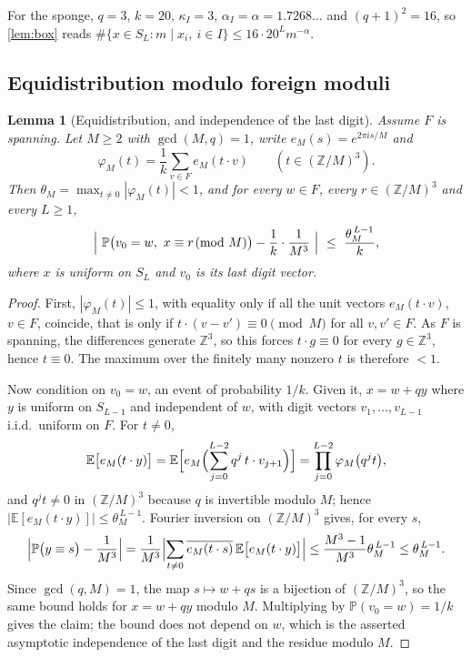 \documentclass[11pt]{amsart}
\newtheorem{lemma}[theorem]{Lemma}
\theoremstyle{definition}
\theoremstyle{remark}
\begin{document}
For the sponge, $q=3$, $k=20$, $\kappa_I=3$, $\alpha_I=\alpha=1.7268\ldots$ and $(q+1)^2=16$, so \cref{lem:box} reads $\#\{x\in S_L:m\mid x_i,\ i\in I\}\le16\cdot20^Lm^{-\alpha}$.

\subsection*{Equidistribution modulo foreign moduli}

\begin{lemma}[Equidistribution, and independence of the last digit]
\label{lem:equi}
Assume $F$ is spanning. Let $M\ge2$ with $\gcd(M,q)=1$, write $e_M(s)=e^{2\pi is/M}$ and
\[
\varphi_M(t)=\frac1k\sum_{v\in F}e_M(t\cdot v)\qquad(t\in(\mathbb Z/M)^3).
\]
Then $\theta_M=\max_{t\ne0}|\varphi_M(t)|<1$, and for every $w\in F$, every $r\in(\mathbb Z/M)^3$ and every $L\ge1$,
\[
\Bigl|\ \mathbb P\bigl(v_0=w,\ x\equiv r\!\!\pmod M\bigr)-\frac1k\cdot\frac1{M^3}\ \Bigr|\ \le\ \frac{\theta_M^{\,L-1}}{k},
\]
where $x$ is uniform on $S_L$ and $v_0$ is its last digit vector.
\end{lemma}

\begin{proof}
First, $|\varphi_M(t)|\le1$, with equality only if all the unit vectors $e_M(t\cdot v)$, $v\in F$, coincide, that is only if $t\cdot(v-v')\equiv0\pmod M$ for all $v,v'\in F$. As $F$ is spanning, the differences generate $\mathbb Z^3$, so this forces $t\cdot g\equiv0$ for every $g\in\mathbb Z^3$, hence $t\equiv0$. The maximum over the finitely many nonzero $t$ is therefore $<1$.

Now condition on $v_0=w$, an event of probability $1/k$. Given it, $x=w+qy$ where $y$ is uniform on $S_{L-1}$ and independent of $w$, with digit vectors $v_1,\dots,v_{L-1}$ i.i.d.\ uniform on $F$. For $t\ne0$,
\[
\mathbb E\bigl[e_M(t\cdot y)\bigr]
=\mathbb E\Bigl[e_M\Bigl(\sum_{j=0}^{L-2}q^{j}\,t\cdot v_{j+1}\Bigr)\Bigr]
=\prod_{j=0}^{L-2}\varphi_M\bigl(q^{j}t\bigr),
\]
and $q^jt\ne0$ in $(\mathbb Z/M)^3$ because $q$ is invertible modulo $M$; hence $|\mathbb E[e_M(t\cdot y)]|\le\theta_M^{\,L-1}$. Fourier inversion on $(\mathbb Z/M)^3$ gives, for every $s$,
\[
\Bigl|\mathbb P\bigl(y\equiv s\bigr)-\frac1{M^3}\Bigr|
=\frac1{M^3}\Bigl|\sum_{t\ne0}\overline{e_M(t\cdot s)}\,\mathbb E\bigl[e_M(t\cdot y)\bigr]\Bigr|
\le\frac{M^3-1}{M^3}\theta_M^{\,L-1}\le\theta_M^{\,L-1}.
\]
Since $\gcd(q,M)=1$, the map $s\mapsto w+qs$ is a bijection of $(\mathbb Z/M)^3$, so the same bound holds for $x=w+qy$ modulo $M$. Multiplying by $\mathbb P(v_0=w)=1/k$ gives the claim; the bound does not depend on $w$, which is the asserted asymptotic independence of the last digit and the residue modulo $M$. \qedhere
\end{proof}
\end{document}

